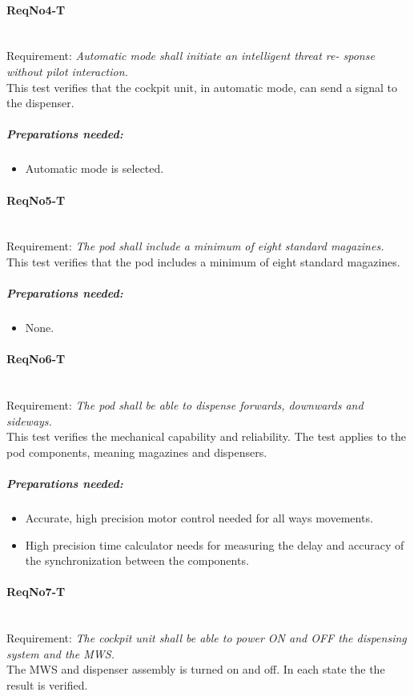 \paragraph{ReqNo4-T}\mbox{}\\ %
Requirement: \textit{Automatic mode shall initiate an intelligent threat re-
sponse without pilot interaction.}\\
This test verifies that the cockpit unit, in automatic mode, can send a signal to the dispenser.

	\subparagraph{Preparations needed:}
	\begin{itemize}
	\item Automatic mode is selected.
	\end{itemize}

\paragraph{ReqNo5-T}\mbox{}\\ %
Requirement: \textit{The pod shall include a minimum of eight standard magazines.}\\
This test verifies that the pod includes a minimum of eight standard magazines.
	\subparagraph{Preparations needed:}
	\begin{itemize}
	\item None.
	\end{itemize}

\paragraph{ReqNo6-T}\mbox{}\\ %
Requirement: \textit{The pod shall be able to dispense forwards, downwards and sideways.}\\
This test verifies the mechanical capability and reliability. The test applies to the pod components, meaning magazines and dispensers.
	\subparagraph{Preparations needed:}
	\begin{itemize}
	\item Accurate, high precision motor control needed for all ways movements.
	\item High precision time calculator needs for measuring the delay and accuracy of the synchronization between the components.
	\end{itemize}

\paragraph{ReqNo7-T}\mbox{}\\ %
Requirement: \textit{The cockpit unit shall be able to power ON and OFF the dispensing system and the MWS.}
\\
The MWS and dispenser assembly is turned on and off. In each state the the result is verified.

